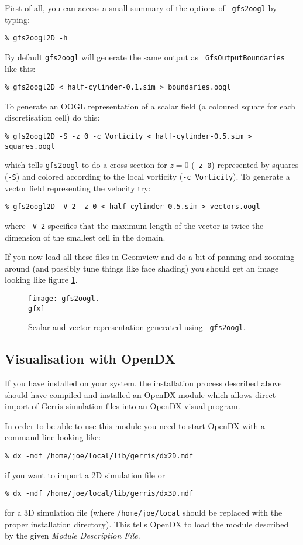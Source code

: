 \documentclass[a4paper]{article}
\begin{document}
First of all, you can access a small summary of the options of {\tt
gfs2oogl} by typing:
\begin{verbatim}
% gfs2oogl2D -h
\end{verbatim}
By default {\tt gfs2oogl} will generate the same output as {\tt
GfsOutputBoundaries} like this:
\begin{verbatim}
% gfs2oogl2D < half-cylinder-0.1.sim > boundaries.oogl
\end{verbatim}
To generate an {\sc OOGL} representation of a scalar field (a coloured square
for each discretisation cell) do this:
\begin{verbatim}
% gfs2oogl2D -S -z 0 -c Vorticity < half-cylinder-0.5.sim > squares.oogl
\end{verbatim}
which tells {\tt gfs2oogl} to do a cross-section for $z = 0$ ({\tt -z
0}) represented by squares ({\tt -S}) and colored according to the local
vorticity ({\tt -c Vorticity}).
To generate a vector field representing the velocity try:
\begin{verbatim}
% gfs2oogl2D -V 2 -z 0 < half-cylinder-0.5.sim > vectors.oogl
\end{verbatim}
where {\tt -V 2} specifies that the maximum length of the vector is
twice the dimension of the smallest cell in the domain.

If you now load all these files in Geomview and do a bit of panning
and zooming around (and possibly tune things like face shading) you
should get an image looking like figure \ref{gfs2oogl}.
\begin{figure}[htbp]
\begin{center}
\texttt{[image: gfs2oogl.\\gfx]}
\end{center}
\caption{Scalar and vector representation generated using {\tt
gfs2oogl}.}
\label{gfs2oogl}
\end{figure}

\subsection{Visualisation with OpenDX}

If you have 
installed on your system, the installation process described above
should have compiled and installed an OpenDX module which allows
direct import of Gerris simulation files into an OpenDX visual
program.

In order to be able to use this module you need to start OpenDX with a
command line looking like:
\begin{verbatim}
% dx -mdf /home/joe/local/lib/gerris/dx2D.mdf
\end{verbatim}
if you want to import a 2D simulation file or
\begin{verbatim}
% dx -mdf /home/joe/local/lib/gerris/dx3D.mdf
\end{verbatim}
for a 3D simulation file (where {\tt /home/joe/local} should be
replaced with the proper installation directory). This tells OpenDX to
load the module described by the given {\em Module Description File}.
\end{document}
